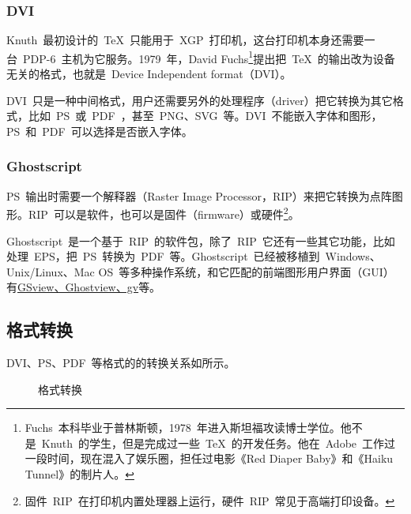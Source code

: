 \subsubsection{DVI}
\label{sec:dvi}
Knuth~最初设计的~\TeX~只能用于~XGP~打印机，这台打印机本身还需要一台~PDP-6~主机为它服务。1979~年，David Fuchs\footnote{Fuchs~本科毕业于普林斯顿，1978~年进入斯坦福攻读博士学位。他不是~Knuth~的学生，但是完成过一些~\TeX~的开发任务。他在~Adobe~工作过一段时间，现在混入了娱乐圈，担任过电影《Red Diaper Baby》和《Haiku Tunnel》的制片人。}提出把~\TeX~的输出改为设备无关的格式，也就是~Device Independent format（DVI）。

DVI~只是一种中间格式，用户还需要另外的处理程序（driver）把它转换为其它格式，比如~PS~或~PDF~，甚至~PNG、SVG~等。DVI~不能嵌入字体和图形，PS~和~PDF~可以选择是否嵌入字体。

\subsubsection{Ghostscript}
\label{sec:ghostscript}
PS~输出时需要一个解释器（Raster Image Processor，RIP）来把它转换为点阵图形。RIP~可以是软件，也可以是固件（firmware）或硬件\footnote{固件~RIP~在打印机内置处理器上运行，硬件~RIP~常见于高端打印设备。}。

Ghostscript~是一个基于~RIP~的软件包，除了~RIP~它还有一些其它功能，比如处理~EPS，把~PS~转换为~PDF~等。Ghostscript~已经被移植到~Windows、Unix/Linux、Mac OS~等多种操作系统，和它匹配的前端图形用户界面（GUI）有\href{http://pages.cs.wisc.edu/~ghost/}{GSview、Ghostview、gv}等。

\subsection{格式转换}
\label{sec:convert_format}
DVI、PS、PDF~等格式的的转换关系如所示。

\begin{figure}[htbp]
\centering
{}
\caption{格式转换}
\label{fig:convert_format}
\end{figure}

